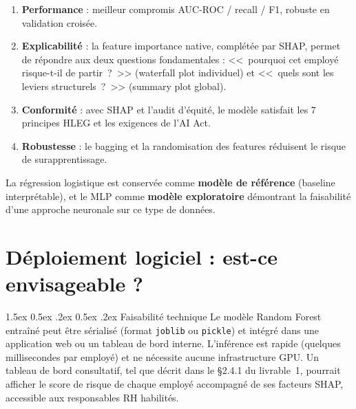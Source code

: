 \documentclass[12pt,a4paper]{article}
\makeatletter
\renewcommand\paragraph{\@startsection{paragraph}{4}{\z@}%
  {1.5ex \@plus 0.5ex \@minus .2ex}%
  {0.5ex \@plus .2ex}%
  {\normalfont\normalsize\bfseries}}
\makeatother
\begin{document}
\begin{enumerate}
    \item \textbf{Performance} : meilleur compromis AUC-ROC / recall / F1, robuste en validation croisée.
    \item \textbf{Explicabilité} : la feature importance native, complétée par SHAP, permet de répondre aux deux questions fondamentales : <<~pourquoi cet employé risque-t-il de partir~?~>> (waterfall plot individuel) et <<~quels sont les leviers structurels~?~>> (summary plot global).
    \item \textbf{Conformité} : avec SHAP et l'audit d'équité, le modèle satisfait les 7 principes HLEG et les exigences de l'AI Act.
    \item \textbf{Robustesse} : le bagging et la randomisation des features réduisent le risque de surapprentissage.
\end{enumerate}

La régression logistique est conservée comme \textbf{modèle de référence} (baseline interprétable), et le MLP comme \textbf{modèle exploratoire} démontrant la faisabilité d'une approche neuronale sur ce type de données.

\section{Déploiement logiciel : est-ce envisageable ?}

\paragraph{Faisabilité technique} Le modèle Random Forest entraîné peut être sérialisé (format \texttt{joblib} ou \texttt{pickle}) et intégré dans une application web ou un tableau de bord interne. L'inférence est rapide (quelques millisecondes par employé) et ne nécessite aucune infrastructure GPU. Un tableau de bord consultatif, tel que décrit dans le §2.4.1 du livrable~1, pourrait afficher le score de risque de chaque employé accompagné de ses facteurs SHAP, accessible aux responsables RH habilités.
\end{document}
